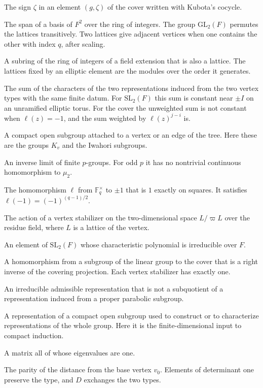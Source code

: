 \documentclass[12pt,letterpaper]{article}
\numberwithin{equation}{section}
\theoremstyle{definition}
\theoremstyle{remark}
\newcommand{\kk}{\mathbb F_q}
\begin{document}
\begin{description}[style=nextline,leftmargin=1.5em]
\item[Kubota coordinate] The sign $\zeta$ in an element $(g,\zeta)$ of the cover written with Kubota's cocycle.
\item[Lattice] The span of a basis of $F^2$ over the ring of integers. The group $\mathrm{GL}_2(F)$ permutes the lattices transitively. Two lattices give adjacent vertices when one contains the other with index $q$, after scaling.
\item[Order] A subring of the ring of integers of a field extension that is also a lattice. The lattices fixed by an elliptic element are the modules over the order it generates.
\item[Packet sum] The sum of the characters of the two representations induced from the two vertex types with the same finite datum. For $\mathrm{SL}_2(F)$ this sum is constant near $\pm I$ on an unramified elliptic torus. For the cover the unweighted sum is not constant when $\ell(z)=-1$, and the sum weighted by $\ell(z)^{j-i}$ is.
\item[Parahoric subgroup] A compact open subgroup attached to a vertex or an edge of the tree. Here these are the groups $K_v$ and the Iwahori subgroups.
\item[Pro-$p$ group] An inverse limit of finite $p$-groups. For odd $p$ it has no nontrivial continuous homomorphism to $\mu_2$.
\item[Quadratic residue character] The homomorphism $\ell$ from $\kk^\times$ to $\pm1$ that is $1$ exactly on squares. It satisfies $\ell(-1)=(-1)^{(q-1)/2}$.
\item[Reduction at a vertex] The action of a vertex stabilizer on the two-dimensional space $L/\varpi L$ over the residue field, where $L$ is a lattice of the vertex.
\item[Regular elliptic element] An element of $\mathrm{SL}_2(F)$ whose characteristic polynomial is irreducible over $F$.
\item[Splitting] A homomorphism from a subgroup of the linear group to the cover that is a right inverse of the covering projection. Each vertex stabilizer has exactly one.
\item[Supercuspidal representation] An irreducible admissible representation that is not a subquotient of a representation induced from a proper parabolic subgroup.
\item[Type] A representation of a compact open subgroup used to construct or to characterize representations of the whole group. Here it is the finite-dimensional input to compact induction.
\item[Unipotent element] A matrix all of whose eigenvalues are one.
\item[Vertex type] The parity of the distance from the base vertex $v_0$. Elements of determinant one preserve the type, and $D$ exchanges the two types.
\end{description}
\end{document}
